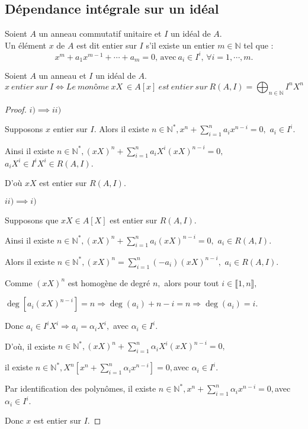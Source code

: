 \subsection{Dépendance intégrale sur un idéal}
\begin{madefinition}
	Soient $A$ un anneau commutatif unitaire et $I$ un idéal de $A$.\\ Un élément $x$ de $A$ est dit entier sur $I$ s'il existe un entier $m \in \mathbb{N}$ tel que : 
	\[ 	x^m + a_1 x^{m-1} + \cdots + a_m = 0\text{, avec} \ a_i \in I^i,\, \forall i=1, \cdots ,m. \]	
\end{madefinition}
\begin{maproposition}
	Soient $A$ un anneau et $I$ un idéal de $A$.
	\[ x \ entier \ sur \ I \Longleftrightarrow Le \ monôme \ xX \ \in A[x] \ est \ entier \ sur \ R(A, I) = \displaystyle \bigoplus_{n \in \mathbb{N}}{I^nX^n} \]
\end{maproposition}
\begin{proof}
	$i) \implies ii)$
	
	Supposons $x$ entier sur $I.$ Alors il existe $n\in \mathbb{N}^{\ast },x^{n}+\sum\limits_{i=1}^{n}a_{i}x^{n-i}=0,$ $a_{i}\in I^{i}.$
	
	Ainsi il existe $n\in \mathbb{N}^{\ast },(xX)^{n}+\sum\limits_{i=1}^{n}a_{i}X^{i}(xX)^{n-i}=0,$ $
	a_{i}X^{i}\in I^{i}X^{i}\in R(A,I).$
	
	D’où $xX$ est entier sur $R(A,I).$
	
	$ii)\implies i)$
	
	Supposons que  $xX\in A[X]$ est entier sur $R(A,I).$
	
	Ainsi il existe $n\in \mathbb{N}^{\ast },(xX)^{n}+\sum\limits_{i=1}^{n}a_{i}(xX)^{n-i}=0,$ $a_{i}\in R(A,I).
	$
	
	Alors il existe $n\in \mathbb{N}^{\ast },(xX)^{n}=\sum\limits_{i=1}^{n}(-a_{i})(xX)^{n-i},$ $a_{i}\in
	R(A,I).$
	
	Comme $(xX)^{n}$ est homogène de degré $n,$ alors pour tout $i\in \llbracket 1, n \rrbracket,$
	
	$\deg [a_{i}(xX)^{n-i}]=n\Rightarrow \deg (a_{i})+n-i=n\Rightarrow \deg
	(a_{i})=i.$
	
	Donc $a_{i}\in I^{i}X^{i}\Rightarrow a_{i}=\alpha _{i}X^{i},$ avec $\alpha
	_{i}\in I^{i}.$
	
	D’où, il existe $n\in \mathbb{N}^{\ast },(xX)^{n}+\sum\limits_{i=1}^{n}\alpha _{i}X^{i}(xX)^{n-i}=0,$
	
	il existe $n\in \mathbb{N}^{\ast },X^{n}[x^{n}+\sum\limits_{i=1}^{n}\alpha _{i}x^{n-i}]=0,$avec $\alpha _{i}\in I^{i}.$
	
	Par identification des polynômes, il existe $n\in \mathbb{N}^{\ast },x^{n}+\sum\limits_{i=1}^{n}\alpha _{i}x^{n-i}=0,$avec $\alpha_{i}\in I^{i}.$
	
	Donc $x$ est entier sur $I.$
\end{proof}

